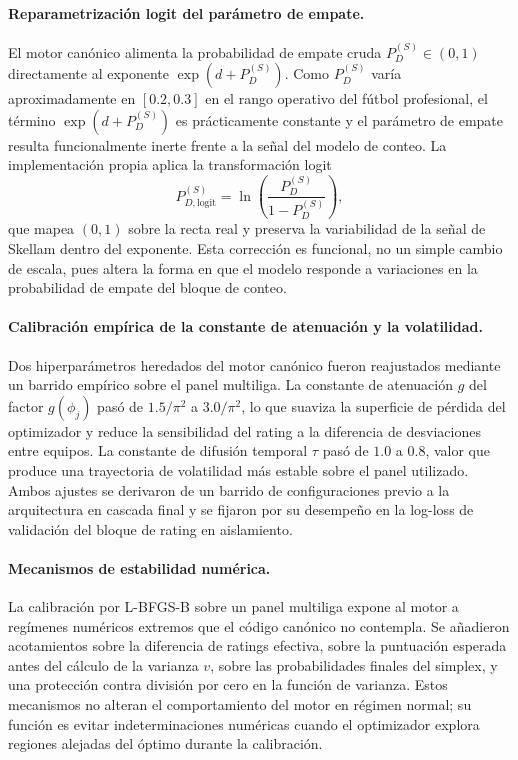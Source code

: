 \paragraph{Reparametrizaci\'on logit del par\'ametro de empate.} El motor can\'onico alimenta la probabilidad de empate cruda $P_D^{(S)} \in (0,1)$ directamente al exponente $\exp(d+P_D^{(S)})$. Como $P_D^{(S)}$ var\'ia aproximadamente en $[0.2, 0.3]$ en el rango operativo del f\'utbol profesional, el t\'ermino $\exp(d+P_D^{(S)})$ es pr\'acticamente constante y el par\'ametro de empate resulta funcionalmente inerte frente a la se\~nal del modelo de conteo. La implementaci\'on propia aplica la transformaci\'on logit
\begin{equation}
	P_{D,\text{logit}}^{(S)} = \ln\!\left(\frac{P_{D}^{(S)}}{1-P_{D}^{(S)}}\right),
\end{equation}
que mapea $(0,1)$ sobre la recta real y preserva la variabilidad de la se\~nal de Skellam dentro del exponente. Esta correcci\'on es funcional, no un simple cambio de escala, pues altera la forma en que el modelo responde a variaciones en la probabilidad de empate del bloque de conteo.

\paragraph{Calibraci\'on emp\'irica de la constante de atenuaci\'on y la volatilidad.} Dos hiperpar\'ametros heredados del motor can\'onico fueron reajustados mediante un barrido emp\'irico sobre el panel multiliga. La constante de atenuaci\'on $g$ del factor $g(\phi_j)$ pas\'o de $1{.}5/\pi^2$ a $3{.}0/\pi^2$, lo que suaviza la superficie de p\'erdida del optimizador y reduce la sensibilidad del rating a la diferencia de desviaciones entre equipos. La constante de difusi\'on temporal $\tau$ pas\'o de $1{.}0$ a $0{.}8$, valor que produce una trayectoria de volatilidad m\'as estable sobre el panel utilizado. Ambos ajustes se derivaron de un barrido de configuraciones previo a la arquitectura en cascada final y se fijaron por su desempe\~no en la log-loss de validaci\'on del bloque de rating en aislamiento.

\paragraph{Mecanismos de estabilidad num\'erica.} La calibraci\'on por L-BFGS-B sobre un panel multiliga expone al motor a reg\'imenes num\'ericos extremos que el c\'odigo can\'onico no contempla. Se a\~nadieron acotamientos sobre la diferencia de ratings efectiva, sobre la puntuaci\'on esperada antes del c\'alculo de la varianza $v$, sobre las probabilidades finales del simplex, y una protecci\'on contra divisi\'on por cero en la funci\'on de varianza. Estos mecanismos no alteran el comportamiento del motor en r\'egimen normal; su funci\'on es evitar indeterminaciones num\'ericas cuando el optimizador explora regiones alejadas del \'optimo durante la calibraci\'on.

